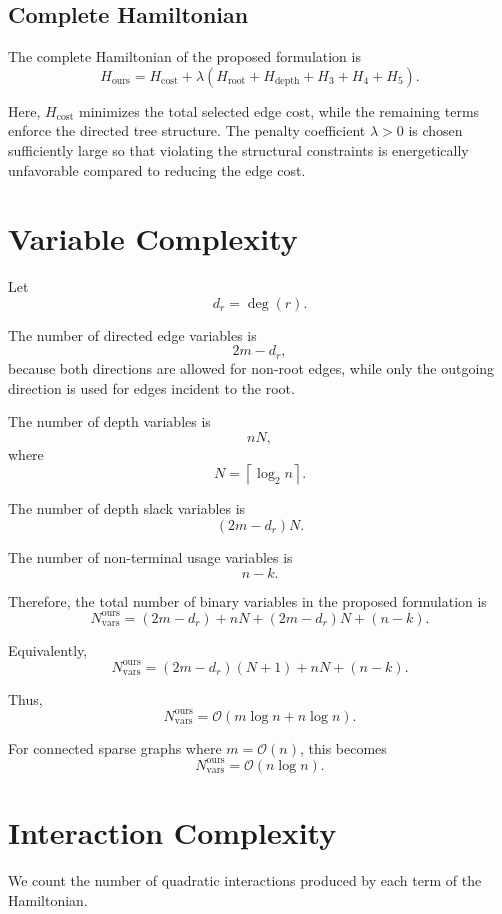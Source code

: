 \documentclass[a4paper,12pt]{report}
\begin{document}
\subsection{Complete Hamiltonian}

The complete Hamiltonian of the proposed formulation is
\[
H_{\text{ours}}
=
H_{\text{cost}}
+
\lambda
\left(
H_{\text{root}}
+
H_{\text{depth}}
+
H_3
+
H_4
+
H_5
\right).
\]

Here, \(H_{\text{cost}}\) minimizes the total selected edge cost, while the remaining terms enforce the directed tree structure. The penalty coefficient \(\lambda>0\) is chosen sufficiently large so that violating the structural constraints is energetically unfavorable compared to reducing the edge cost.

\section{Variable Complexity}

Let
\[
d_r=\deg(r).
\]

The number of directed edge variables is
\[
2m-d_r,
\]
because both directions are allowed for non-root edges, while only the outgoing direction is used for edges incident to the root.

The number of depth variables is
\[
nN,
\]
where
\[
N=\left\lceil\log_2 n\right\rceil.
\]

The number of depth slack variables is
\[
(2m-d_r)N.
\]

The number of non-terminal usage variables is
\[
n-k.
\]

Therefore, the total number of binary variables in the proposed formulation is
\[
N_{\text{vars}}^{\text{ours}}
=
(2m-d_r)
+
nN
+
(2m-d_r)N
+
(n-k).
\]

Equivalently,
\[
N_{\text{vars}}^{\text{ours}}
=
(2m-d_r)(N+1)
+
nN
+
(n-k).
\]

Thus,
\[
N_{\text{vars}}^{\text{ours}}
=
\mathcal{O}(m\log n+n\log n).
\]

For connected sparse graphs where \(m=\mathcal{O}(n)\), this becomes
\[
N_{\text{vars}}^{\text{ours}}
=
\mathcal{O}(n\log n).
\]

\section{Interaction Complexity}

We count the number of quadratic interactions produced by each term of the Hamiltonian.
\end{document}
